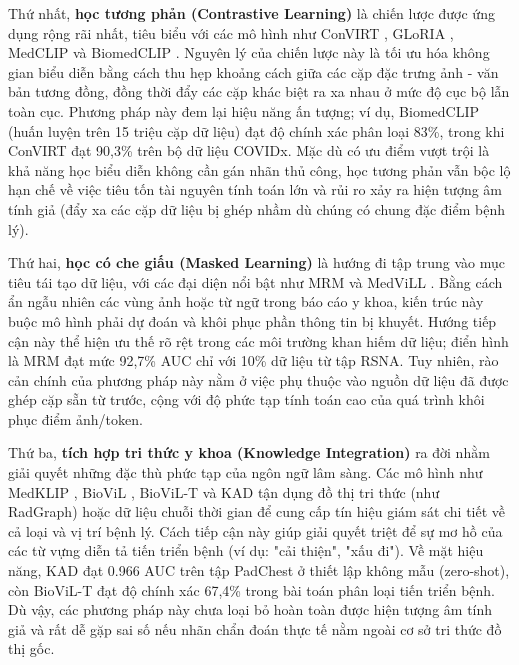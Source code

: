   Thứ nhất, \textbf{học tương phản (Contrastive Learning)} là chiến lược được ứng dụng rộng rãi nhất, tiêu biểu với các mô hình như ConVIRT \cite{ConVIRT}, GLoRIA \cite{GLoRIA}, MedCLIP \cite{MedCLIP} và BiomedCLIP \cite{BiomedCLIP}. Nguyên lý của chiến lược này là tối ưu hóa không gian biểu diễn bằng cách thu hẹp khoảng cách giữa các cặp đặc trưng ảnh - văn bản tương đồng, đồng thời đẩy các cặp khác biệt ra xa nhau ở mức độ cục bộ lẫn toàn cục. Phương pháp này đem lại hiệu năng ấn tượng; ví dụ, BiomedCLIP \cite{BiomedCLIP} (huấn luyện trên 15 triệu cặp dữ liệu) đạt độ chính xác phân loại 83\%, trong khi ConVIRT \cite{ConVIRT} đạt 90,3\% trên bộ dữ liệu COVIDx. Mặc dù có ưu điểm vượt trội là khả năng học biểu diễn không cần gán nhãn thủ công, học tương phản vẫn bộc lộ hạn chế về việc tiêu tốn tài nguyên tính toán lớn và rủi ro xảy ra hiện tượng âm tính giả (đẩy xa các cặp dữ liệu bị ghép nhầm dù chúng có chung đặc điểm bệnh lý).
  
  Thứ hai, \textbf{học có che giấu (Masked Learning)} là hướng đi tập trung vào mục tiêu tái tạo dữ liệu, với các đại diện nổi bật như MRM \cite{MRM} và MedViLL \cite{MedViLL}. Bằng cách ẩn ngẫu nhiên các vùng ảnh hoặc từ ngữ trong báo cáo y khoa, kiến trúc này buộc mô hình phải dự đoán và khôi phục phần thông tin bị khuyết. Hướng tiếp cận này thể hiện ưu thế rõ rệt trong các môi trường khan hiếm dữ liệu; điển hình là MRM \cite{MRM} đạt mức 92,7\% AUC chỉ với 10\% dữ liệu từ tập RSNA. Tuy nhiên, rào cản chính của phương pháp này nằm ở việc phụ thuộc vào nguồn dữ liệu đã được ghép cặp sẵn từ trước, cộng với độ phức tạp tính toán cao của quá trình khôi phục điểm ảnh/token.

  Thứ ba, \textbf{tích hợp tri thức y khoa (Knowledge Integration)} ra đời nhằm giải quyết những đặc thù phức tạp của ngôn ngữ lâm sàng. Các mô hình như MedKLIP \cite{MedKLIP}, BioViL \cite{BioViL}, BioViL-T \cite{BioViL-T} và KAD \cite{KAD} tận dụng đồ thị tri thức (như RadGraph) hoặc dữ liệu chuỗi thời gian để cung cấp tín hiệu giám sát chi tiết về cả loại và vị trí bệnh lý. Cách tiếp cận này giúp giải quyết triệt để sự mơ hồ của các từ vựng diễn tả tiến triển bệnh (ví dụ: "cải thiện", "xấu đi"). Về mặt hiệu năng, KAD \cite{KAD} đạt 0.966 AUC trên tập PadChest ở thiết lập không mẫu (zero-shot), còn BioViL-T \cite{BioViL-T} đạt độ chính xác 67,4\% trong bài toán phân loại tiến triển bệnh. Dù vậy, các phương pháp này chưa loại bỏ hoàn toàn được hiện tượng âm tính giả và rất dễ gặp sai số nếu nhãn chẩn đoán thực tế nằm ngoài cơ sở tri thức đồ thị gốc.
  
